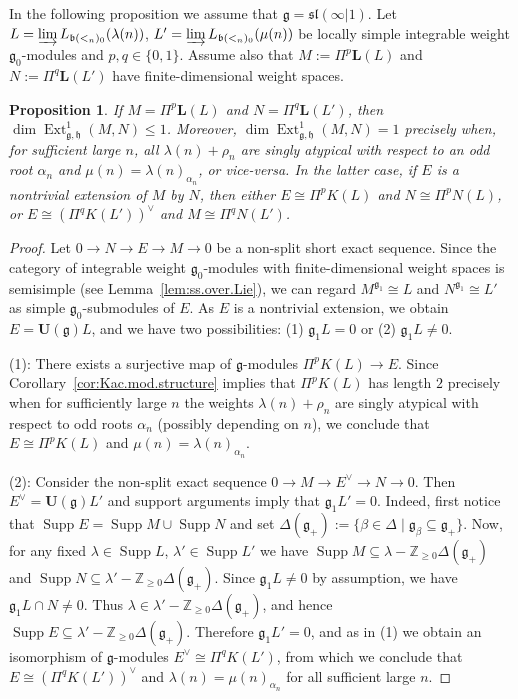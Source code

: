\documentclass[12pt]{amsart}
\newcommand\Z{\mathbb{Z}}
\newcommand\g{\mathfrak{g}}
\newcommand\fh{\mathfrak{h}}
\newcommand\fb{\mathfrak{b}}
\newcommand\fsl{\mathfrak{sl}}
\newcommand\D{\Delta}
\newcommand\bU{\mathbf{U}}
\newcommand\bL{\mathbf{L}}
\DeclareMathOperator{\Ext}{Ext}
\DeclareMathOperator{\Supp}{Supp} %
\theoremstyle{plain}
\newtheorem{prop}[theo]{Proposition}
\theoremstyle{definition}
\numberwithin{equation}{section}
\begin{document}
In the following proposition we assume that $\g=\fsl(\infty|1)$. Let $L = \varinjlim L_{\fb(<_n)_0}(\lambda(n))$, $L' = \varinjlim L_{\fb(<_n)_0}(\mu(n))$ be locally simple integrable weight $\g_0$-modules and $p,q\in \{0,1\}$. Assume also that $M := \Pi^p\bL(L)$ and $N := \Pi^q \bL(L')$ have finite-dimensional weight spaces.

\begin{prop}\label{prop:non-triv.ex=kac}
If $M = \Pi^p\bL(L)$ and $N = \Pi^q \bL(L')$, then  $\dim \Ext_{\g, \fh}^1(M,N)\leq 1$. Moreover, $\dim \Ext_{\g, \fh}^1(M,N) = 1$ precisely when, for sufficient large $n$, all $\lambda(n)+\rho_n$ are  singly atypical with respect to an odd root $\alpha_n$ and $\mu(n) = \lambda(n)_{\alpha_n}$, or vice-versa. In the latter case, if $E$ is a nontrivial extension of $M$ by $N$, then either $E\cong \Pi^pK(L)$ and $N\cong \Pi^pN(L)$, or $E\cong (\Pi^qK(L'))^\vee$ and $M\cong \Pi^qN(L')$.
\end{prop}
\begin{proof}
Let $0\to N\to E\to M\to 0$ be a non-split short exact sequence. Since the category of integrable weight $\g_0$-modules with finite-dimensional weight spaces is semisimple (see Lemma~\ref{lem:ss.over.Lie}), we can regard $M^{\g_{1}}\cong L$ and $N^{\g_1}\cong L'$ as simple $\g_0$-submodules of $E$.  As $E$ is a nontrivial extension, we obtain $E = \bU(\g)L$, and we have two possibilities: (1) $\g_1 L=0$ or (2) $\g_1 L\neq 0$. 

(1): There exists a surjective map of $\g$-modules $\Pi^pK(L)\to E$.  Since Corollary~\ref{cor:Kac.mod.structure} implies that $\Pi^pK(L)$ has length $2$ precisely when for sufficiently large $n$ the weights $\lambda(n)+\rho_n$ are singly atypical with respect to odd roots $\alpha_n$ (possibly depending on $n$), we conclude that $E\cong \Pi^pK(L)$ and $\mu(n) = \lambda(n)_{\alpha_n}$.

(2): Consider the non-split exact sequence $0\to M\to E^\vee\to N\to 0$.  Then $E^\vee = \bU(\g)L'$ and support arguments imply that $\g_1 L'=0$. Indeed, first notice that $\Supp E = \Supp M\cup \Supp N$ and set $\Delta(\g_+) := \{\beta\in \D\mid \g_\beta\subseteq \g_+\}$. Now, for any fixed $\lambda\in \Supp L$, $\lambda'\in \Supp L'$ we have $\Supp M \subseteq \lambda - \Z_{\geq 0}\Delta(\g_+)$ and $\Supp N \subseteq \lambda' - \Z_{\geq 0}\Delta(\g_+)$. Since $\g_1L\neq 0$ by assumption, we have $\g_1L\cap N\neq 0$. Thus $\lambda \in \lambda' - \Z_{\geq 0}\Delta(\g_+)$, and hence $\Supp E \subseteq \lambda'- \Z_{\geq 0}\Delta(\g_+)$. Therefore $\g_1L'=0$, and as in (1) we obtain an isomorphism of $\g$-modules $E^\vee\cong \Pi^qK(L')$, from which we conclude that $E\cong (\Pi^qK(L'))^\vee$ and $\lambda(n) = \mu(n)_{\alpha_n}$ for all sufficient large $n$.
\end{proof}
\end{document}
